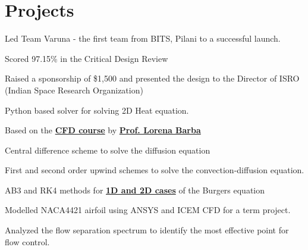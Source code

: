 \documentclass[]{resume}
\begin{document}
\begin{minipage}[t]{0.66\textwidth}
\section{Projects}
\begin{tightemize}
\item Led Team Varuna - the first team from BITS, Pilani to a successful launch.
\item Scored 97.15\% in the Critical Design Review
\item Raised a sponsorship of \$1,500 and presented the design to the Director of ISRO
(Indian Space Research Organization)
\end{tightemize}
\sectionsep

\begin{tightemize}
\item Python based solver for solving 2D Heat equation.
\item Based on the \textbf{\href{https://itunes.apple.com/us/itunes-u/computational-fluid-dynamics/id452560554?mt=10}
        {CFD course}} by \textbf{\href{http://lorenabarba.com}{Prof. Lorena Barba}}
\end{tightemize}
\begin{tightemize}
\item Central difference scheme to solve the diffusion equation
\item First and second order upwind schemes to solve the convection-diffusion equation.
\item AB3 and RK4 methods for \textbf{\href{https://github.com/sriramkswamy/CFDEGM6342.git}{1D and 2D cases}} of the Burgers equation
\end{tightemize}
\begin{tightemize}
\item Modelled NACA4421 airfoil using ANSYS and ICEM CFD for a term project.
\item Analyzed the flow separation spectrum to identify the most effective point for flow control.
\end{tightemize}
\sectionsep



\end{minipage}
\end{document}
